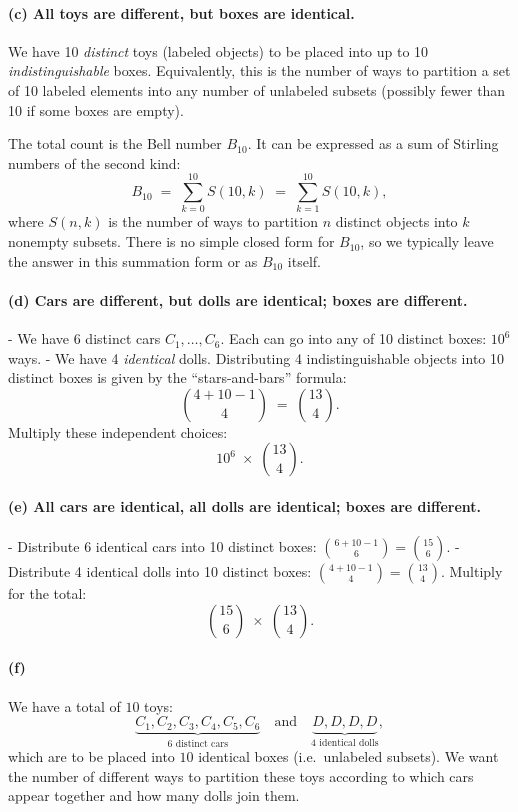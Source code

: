 \documentclass[docmute]{article}
\begin{document}
\paragraph{(c) All toys are different, but boxes are identical.}
We have 10 \emph{distinct} toys (labeled objects) to be placed into up to 10 \emph{indistinguishable} boxes. Equivalently, this is the number of ways to partition a set of 10 labeled elements into any number of unlabeled subsets (possibly fewer than 10 if some boxes are empty).

The total count is the Bell number \(B_{10}\). It can be expressed as a sum of Stirling numbers of the second kind:
\[
B_{10}
\;=\;
\sum_{k=0}^{10} S(10,k)
\;=\;
\sum_{k=1}^{10} S(10,k),
\]
where \(S(n,k)\) is the number of ways to partition \(n\) distinct objects into \(k\) nonempty subsets. There is no simple closed form for \(B_{10}\), so we typically leave the answer in this summation form or as \(B_{10}\) itself.

\paragraph{(d) Cars are different, but dolls are identical; boxes are different.}
- We have 6 distinct cars \(C_1,\ldots,C_6\). Each can go into any of 10 distinct boxes: \(10^6\) ways.
- We have 4 \emph{identical} dolls. Distributing 4 indistinguishable objects into 10 distinct boxes is given by the ``stars-and-bars'' formula:
  \[
  \binom{4 + 10 - 1}{4} \;=\;\binom{13}{4}.
  \]
Multiply these independent choices:
\[
10^6 \;\times\; \binom{13}{4}.
\]

\paragraph{(e) All cars are identical, all dolls are identical; boxes are different.}
- Distribute 6 identical cars into 10 distinct boxes: \(\displaystyle \binom{6 + 10 - 1}{6} = \binom{15}{6}.\)
- Distribute 4 identical dolls into 10 distinct boxes: \(\displaystyle \binom{4 + 10 - 1}{4} = \binom{13}{4}.\)
Multiply for the total:
\[
\binom{15}{6} \;\times\; \binom{13}{4}.
\]

\paragraph{(f)}

We have a total of \(10\) toys:
\[
\underbrace{C_1, C_2, C_3, C_4, C_5, C_6}_{\text{6 distinct cars}}
\quad\text{and}\quad
\underbrace{D, D, D, D}_{\text{4 identical dolls}},
\]
which are to be placed into \(10\) identical boxes (i.e.\ unlabeled subsets). 
We want the number of different ways to partition these toys according to which cars appear together and how many dolls join them.
\end{document}
